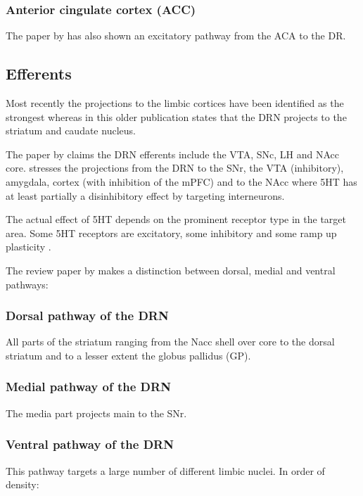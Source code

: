 \documentclass[12pt,a4paper]{article}
\begin{document}
\subsubsection{Anterior cingulate cortex (ACC)}
The paper by \citet{PollakDorocic2014} has also shown an excitatory
pathway from the ACA to the DR.

\subsection{Efferents}
Most recently the projections to the limbic cortices have been
identified as the strongest \citep{Linley2013} \citep{Roberts2011}
whereas in this older publication \citep{Reisine1984} states that the
DRN projects to the striatum and caudate nucleus.

The paper by \citep{Vertes2010} claims the DRN efferents include the
VTA, SNc, LH and NAcc core. \citep{Nakamura2013} stresses the
projections from the DRN to the SNr, the VTA (inhibitory), amygdala,
cortex (with inhibition of the mPFC) and to the NAcc where 5HT has at
least partially a disinhibitory effect by targeting interneurons.

The actual effect of 5HT depends on the prominent receptor type in the
target area. Some 5HT receptors are excitatory, some inhibitory and
some ramp up plasticity \citep{Frazer1999}.

The review paper by \citet{Michelsen2007} makes a distinction between
dorsal, medial and ventral pathways:

\subsubsection{Dorsal pathway of the DRN}
All parts of the striatum ranging from the Nacc shell over core to the dorsal striatum
and to a lesser extent the globus pallidus (GP).

\subsubsection{Medial pathway of the DRN}
The media part projects main to the SNr.

\subsubsection{Ventral pathway of the DRN}
This pathway targets a large number of different limbic nuclei. In order of density:
\end{document}

